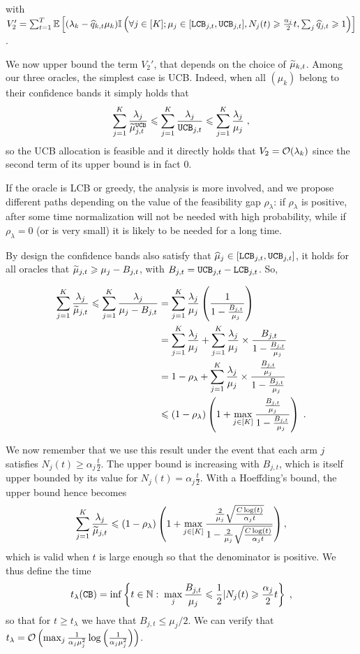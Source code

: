 with $V_2'=\sum_{t=1}^T \mathbb{E}\left[(\lambda_k - \widehat{q}_{k,t}\mu_k)\mathbb{I}\left(\forall j \in [K]; \mu_j \in [\texttt{LCB}_{j, t}, \texttt{UCB}_{j, t}], N_j(t)\geqslant \frac{\alpha_j}{2}t, \sum_j \widehat{q}_{j,t} \geqslant 1\right)\right]$.

We now upper bound the term $V_2'$, that depends on the choice of $\widetilde{\mu}_{k,t}$. Among our three oracles, the simplest case is UCB. Indeed, when all $(\mu_k)$ belong to their confidence bands it simply holds that  \[\sum_{j=1}^K \frac{\lambda_j}{\widetilde{\mu}_{j,t}^{\texttt{UCB}}} \leqslant \sum_{j=1}^K \frac{\lambda_j}{ \texttt{UCB}_{j,t}} \leqslant \sum_{j=1}^K \frac{\lambda_j}{ \mu_j}\;,\] so the UCB allocation is feasible and it directly holds that $V_2=\mathcal{O}(\lambda_k)$ since the second term of its upper bound is in fact $0$.

If the oracle is LCB or greedy, the analysis is more involved, and we propose different paths depending  on the value of the feasibility gap $\rho_\lambda$: if $\rho_\lambda$ is positive, after some time normalization will not be needed with high probability, while if $\rho_\lambda=0$ (or is very small) it is likely to be needed for a long time.

By design the confidence bands also satisfy that $\widehat{\mu}_j \in [\texttt{LCB}_{j, t}, \texttt{UCB}_{j, t}]$, it holds for all oracles that $\widetilde{\mu}_{j, t}\geqslant \mu_j- B_{j, t}$, with $B_{j,t} = \texttt{UCB}_{j, t} - \texttt{LCB}_{j, t}$. So, 

\begin{align*}
\sum_{j=1}^K \frac{\lambda_j}{\widetilde{\mu}_{j, t}} \leqslant \sum_{j=1}^K \frac{\lambda_j}{\mu_j - B_{j, t}} &= \sum_{j=1}^K \frac{\lambda_j}{\mu_j}\left(\frac{1}{1-\frac{B_{j, t}}{\mu_j}}\right) \\ &= \sum_{j=1}^K \frac{\lambda_j}{\mu_j} + \sum_{j=1}^K \frac{\lambda_j}{\mu_j}\times \frac{B_{j, t}}{1 - \frac{B_{j, t}}{\mu_j}} \\
& = 1-\rho_\lambda +\sum_{j=1}^K \frac{\lambda_j}{\mu_j}\times \frac{\frac{B_{j, t}}{\mu_j}}{1 - \frac{B_{j, t}}{\mu_j}}   \\
& \leqslant (1-\rho_\lambda)\left(1+ \max_{j\in[K]}\frac{\frac{B_{j, t}}{\mu_j}}{1 - \frac{B_{j, t}}{\mu_j}} \right) \;.  \\
\end{align*}

We now remember that we use this result under the event that each arm $j$ satisfies $N_j(t)\geq \alpha_j \frac{t}{2}$. The upper bound is increasing with $B_{j,t }$, which is itself upper bounded by its value for $N_j(t)= \alpha_j \frac{t}{2}$. With a Hoeffding's bound, the upper bound hence becomes 
\[\sum_{j=1}^K \frac{\lambda_j}{\widetilde{\mu}_{j, t}} \leqslant (1-\rho_\lambda)\left(1+ \max_{j\in[K]}\frac{\frac{2}{\mu_j}\sqrt{\frac{C\log(t)}{\alpha_j t}}}{1-\frac{2}{\mu_j}\sqrt{\frac{C\log(t)}{\alpha_j t}}} \right),\]
which is valid when $t$ is large enough so that the denominator is positive. We thus define the time \[t_\lambda(\texttt{CB})= \inf\left\{t \in \mathbb{N}: \; \max_j \frac{B_{j,t}}{\mu_j}\leqslant \frac{1}{2} | N_j(t)\geqslant \frac{\alpha_j}{2}t \right\}\;,\] so that for $t\geq t_\lambda$ we have that $B_{j,t}\leq \mu_j/2$. We can verify that $t_\lambda=\mathcal{O}\left(\max_j\frac{1}{\alpha_j\mu_j^2}\log\left(\frac{1}{\alpha_j\mu_j^2}\right)\right)$.

